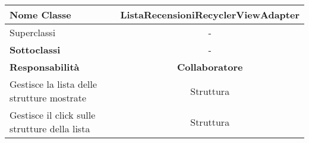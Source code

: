 
\setcounter{table}{0}
\begin{table}[H]
    \centering
    \begin{tabularx}{\textwidth}{||   X  ||  c   ||}
        \hline
        \rowcolor{Gray}
        \textbf{Nome Classe} & ListaRecensioniRecyclerViewAdapter\\
        \hline
        Superclassi  &  - \\
        \hline
        \textbf{Sottoclassi} & - \\
        \hline
        \hline
         \textbf{Responsabilità} & \textbf{Collaboratore} \\
         \hline
          Gestisce la lista delle strutture mostrate & Struttura \\
         \hline
          Gestisce il click sulle strutture della lista & Struttura \\
         \hline
    \end{tabularx}
\end{table}
